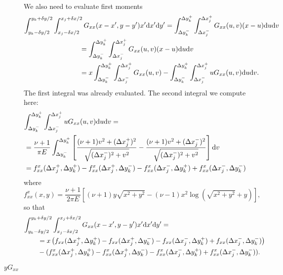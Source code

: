\documentclass{article}
\newcommand{\dd}{\mathrm{d}}
\begin{document}
\begin{description}
We also need to evaluate first moments
\begin{align}
\lefteqn{
\int_{y_k-\delta y/2}^{y_k+\delta y/2}  \int_{x_j-\delta x/2}^{x_j+\delta x/2} G_{xx}(x-x',y-y')x'\dd x'  \dd y'=  \int_{\Delta y_{k}^-}^{\Delta y_k^+}  \int_{\Delta x_j^-}^{\Delta x_j^+} G_{xx}(u,v)(x-u) \dd u \dd v} \nonumber \\
&\qquad\qquad\qquad\qquad=\int_{\Delta y_{k}^-}^{\Delta y_k^+}  \int_{\Delta x_j^-}^{\Delta x_j^+} G_{xx}(u,v)(x-u) \dd u \dd v \nonumber\\
&\qquad\qquad\qquad\qquad= x \int_{\Delta y_{k}^-}^{\Delta y_k^+}  \int_{\Delta x_j^-}^{\Delta x_j^+} G_{xx}(u,v) - \int_{\Delta y_{k}^-}^{\Delta y_k^+}  \int_{\Delta x_j^-}^{\Delta x_j^+} uG_{xx}(u,v)  \dd u \dd v.
\end{align}
The first integral was already evaluated. The second integral we compute here:
\begin{align}
\lefteqn{\int_{\Delta y_{k}^-}^{\Delta y_k^+}  \int_{\Delta x_j^-}^{\Delta x_j^+} uG_{xx}(u,v)  \dd u \dd v =} \nonumber \\
&=\frac{\nu+1}{\pi E}\int_{\Delta y_{k}^-}^{\Delta y_k^+} \left[ \frac{(\nu+1)v^2 + (\Delta x_j^+)^2}{\sqrt{(\Delta x_j^-)^2 + v^2}} -\frac{(\nu+1)v^2 + (\Delta x_j^-)^2}{\sqrt{(\Delta x_j^-)^2 + v^2}}  \right] \dd v \nonumber \\
&= f^x_{xx}( \Delta x_j^+ , \Delta y_k^+) - f^x_{xx}( \Delta x_j^+ , \Delta y_k^-)-f^x_{xx}(\Delta x_j^-, \Delta y_k^+) + f^x_{xx}(\Delta x_j^- , \Delta y_k^-)
\end{align}
where
\begin{equation}
f^x_{xx}(x,y) = \frac{\nu+1}{2\pi E} \left[ (\nu+1)y\sqrt{x^2 + y^2} - (\nu-1) x^2\log\left(\sqrt{x^2 + y^2} +y  \right)  \right],
\end{equation}
so that
\begin{align}
\lefteqn{\int_{y_k-\delta y/2}^{y_k+\delta y/2}  \int_{x_j-\delta x/2}^{x_j+\delta x/2} G_{xx}(x-x',y-y')x'\dd x'  \dd y'=}\nonumber\\
&\qquad = x\left( f_{xx}( \Delta x_j^+,\Delta y_k^+) - f_{xx}( \Delta x_j^+,\Delta y_k^-) -f_{xx}(\Delta x_j^-, \Delta y_k^+) + f_{xx}(\Delta x_j^- , \Delta y_k^-)\right) \nonumber \\
&\qquad - ( f^x_{xx}( \Delta x_j^+ , \Delta y_k^+) - f^x_{xx}( \Delta x_j^+ , \Delta y_k^-)-f^x_{xx}(\Delta x_j^-, \Delta y_k^+) + f^x_{xx}(\Delta x_j^- , \Delta y_k^-)).
\end{align}

\item[$yG_{xx}$]


\end{description}
\end{document}
